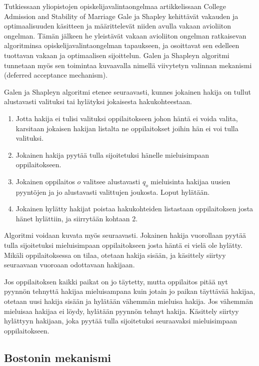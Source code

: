 \documentclass[gradu, twoside]{tktltiki}
\begin{document}
Tutkiessaan yliopistojen opiskelijavalintaongelmaa artikkelissaan
College Admission and Stability of Marriage \cite{galeshapley62} Gale
ja Shapley kehittävät vakauden ja optimaalisuuden käsitteen ja
määrittelevät niiden avulla vakaan avioliiton ongelman. Tämän jälkeen
he yleistävät vakaan avioliiton ongelman ratkaisevan algoritminsa
opiskelijavalintaongelman tapaukseen, ja osoittavat sen edelleen
tuottavan vakaan ja optimaalisen sijoittelun. Galen ja Shapleyn
algoritmi tunnetaan myös sen toimintaa kuvaavalla nimellä viivytetyn
valinnan mekanismi (deferred acceptance mechanism).
\newpage

Galen ja Shapleyn algoritmi etenee seuraavasti, kunnes jokainen hakija
on tullut alustavasti valituksi tai hylätyksi jokaisesta
hakukohteestaan.

\begin{enumerate}
\item Jotta hakija ei tulisi valituksi oppilaitokseen johon häntä ei
  voida valita, karsitaan jokaisen hakijan listalta ne oppilaitokset
  joihin hän ei voi tulla valituksi.

\item Jokainen hakija pyytää tulla sijoitetuksi hänelle mieluisimpaan
  oppilaitokseen.

\item Jokainen oppilaitos $o$ valitsee alustavasti $q_o$ mieluisinta
  hakijaa uusien pyyntöjen ja jo alustavasti valittujen joukosta.
  Loput hylätään.

\item Jokainen hylätty hakijat poistaa hakukohteiden listastaan
  oppilaitoksen josta hänet hylättiin, ja siirrytään kohtaan 2.
\end{enumerate}

Algoritmi voidaan kuvata myös seuraavasti. Jokainen hakija vuorollaan
pyytää tulla sijoitetuksi mieluisimpaan oppilaitokseen josta häntä ei
vielä ole hylätty. Mikäli oppilaitoksessa on tilaa, otetaan hakija
sisään, ja käsittely siirtyy seuraavaan vuoroaan odottavaan hakijaan.

Jos oppilaitoksen kaikki paikat on jo täytetty, mutta oppilaitos pitää
nyt pyynnön tehnyttä hakijaa mieluisampana kuin jotain jo paikan
täyttävää hakijaa, otetaan uusi hakija sisään ja hylätään vähemmän
mieluisa hakija. Jos vähemmän mieluisaa hakijaa ei löydy, hylätään
pyynnön tehnyt hakija. Käsittely siirtyy hylättyyn hakijaan, joka
pyytää tulla sijoitetuksi seuraavaksi mieluisimpaan oppilaitokseen.

\subsection{Bostonin mekanismi}
\end{document}
